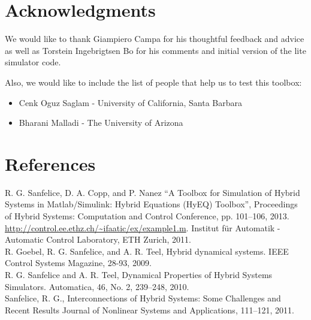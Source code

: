 \documentclass{article}
\begin{document}
\section{Acknowledgments}
\label{sec:acknowledgments}

We would like to thank Giampiero Campa for his thoughtful feedback and advice as well as Torstein Ingebrigtsen Bo for his comments and initial version of the lite simulator code.

Also, we would like to include the list of people that help us to test this toolbox:

\begin{itemize}
\item Cenk Oguz Saglam - University of California, Santa Barbara
\item Bharani Malladi - The University of Arizona
\end{itemize}
\section{References}
\label{sec:refs}

\noindent
[1] R. G. Sanfelice, D. A. Copp, and P. Nanez ``A Toolbox for Simulation of Hybrid Systems in Matlab/Simulink: Hybrid Equations (HyEQ) Toolbox'', Proceedings of Hybrid Systems: Computation and Control Conference, pp. 101--106, 2013.
\\
\noindent
[2] \url{http://control.ee.ethz.ch/~ifaatic/ex/example1.m}. Institut f{\"u}r Automatik - Automatic Control Laboratory, ETH Zurich, 2011.
\\
\noindent
[3] R. Goebel, R. G. Sanfelice, and A. R. Teel, Hybrid dynamical systems.
IEEE Control Systems Magazine, 28-93, 2009.
\\
\noindent
[4] R. G. Sanfelice and A. R. Teel, Dynamical Properties of Hybrid Systems Simulators.
Automatica, 46, No. 2, 239--248, 2010.
\\
\noindent
[5] Sanfelice, R. G., Interconnections of Hybrid Systems: Some Challenges and Recent Results
Journal of Nonlinear Systems and Applications, 111--121, 2011.

   
\end{document}
